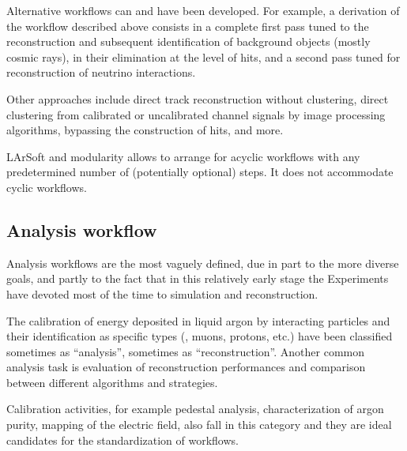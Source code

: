 Alternative workflows can and have been developed.
For example, a derivation of the workflow described above consists in a complete
first pass tuned to the reconstruction and subsequent identification of background
objects (mostly cosmic rays), in their elimination at the level of hits,
and a second pass tuned for reconstruction of neutrino interactions.

Other approaches include direct track reconstruction without clustering,
direct clustering from calibrated or uncalibrated channel signals
by image processing algorithms, bypassing the construction of hits, and more.

LArSoft and \ART modularity allows to arrange for acyclic workflows
with any predetermined number of (potentially optional) steps.
It does not accommodate cyclic workflows.


\subsection{Analysis workflow}
\label{ssec:Workflows:Analysis}

Analysis workflows are the most vaguely defined,
due in part to the more diverse goals,
and partly to the fact that in this relatively early stage the Experiments
have devoted most of the time to simulation and reconstruction.

The calibration of energy deposited in liquid argon by interacting particles
and their identification as specific types (\eg, muons, protons, etc.)
have been classified sometimes as ``analysis'', sometimes as ``reconstruction''.
Another common analysis task is evaluation of reconstruction performances
and comparison between different algorithms and strategies.

Calibration activities, for example pedestal analysis,
characterization of argon purity, mapping of the electric field,
also fall in this category and they are ideal candidates for the standardization of workflows.

